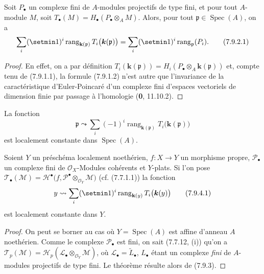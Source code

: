 \begin{proposition}[7.9.2]
\label{III.7.9.2.fr}
Soit $P_\bullet$ un complexe fini de $A$-modules projectifs de type fini, et
pour tout $A$-module $M$, soit
$T_\bullet(M)=H_\bullet(P_\bullet\otimes_A M)$. Alors, pour tout
$\mathfrak p\in\operatorname{Spec}(A)$, on a
\[
  \sum_i(\setmin 1)^i\operatorname{rang}_{\mathbf{k}(\mathfrak p)}
  T_i\bigl(\boldsymbol{k}(\mathfrak p)\bigr)
  =\sum_i(\setmin 1)^i\operatorname{rang}_{\mathfrak p}(P_i).
  \tag{7.9.2.1}\label{III.7.9.2.1.fr}
\]
\end{proposition}

\begin{proof}
En effet, on a par définition
$T_i(\boldsymbol{k}(\mathfrak p))=H_i(P_\bullet\otimes_A\boldsymbol{k}(\mathfrak p))$ et,
compte tenu de (7.9.1.1), la formule (7.9.1.2) n'est autre que l'invariance de
la caractéristique d'Euler-Poincaré d'un complexe fini d'espaces vectoriels de
dimension finie par passage à l'homologie (\textbf{0}, 11.10.2).
\end{proof}

\begin{corollary}[7.9.3]
\label{III.7.9.3.fr}
La fonction
\[
  \mathfrak p\leadsto
  \sum_i(-1)^i\operatorname{rang}_{\mathbf{k}(\mathfrak p)}
  T_i\bigl(\boldsymbol{k}(\mathfrak p)\bigr)
\]
est localement constante dans $\operatorname{Spec}(A)$.
\end{corollary}

\begin{theorem}[7.9.4]
\label{III.7.9.4.fr}
Soient $Y$ un préschéma localement noethérien, $f:X\to Y$ un morphisme propre,
$\mathscr P_\bullet$ un complexe fini de $\mathscr O_X$-Modules cohérents et
$Y$-plats. Si l'on pose
$\mathscr T_\bullet(\mathscr M)
  =\mathscr H^{\bullet}
  \bigl(f,\mathscr P^\bullet\otimes_{\mathscr O_Y}\mathscr M\bigr)$ \textup{(cf. (7.7.1.1))}
la fonction
\[
  y\leadsto
  \sum_i(\setmin 1)^i\operatorname{rang}_{\mathbf{k}(y)}
  T_i\bigl(\boldsymbol{k}(y)\bigr)
  \tag{7.9.4.1}\label{III.7.9.4.1.fr}
\]
est localement constante dans $Y$.
\end{theorem}

\begin{proof}
On peut se borner au cas où $Y=\operatorname{Spec}(A)$ est affine d'anneau $A$
noethérien. Comme le complexe $\mathscr P_\bullet$ est fini, on sait (7.7.12,
(i)) qu'on a
$\mathscr T_p(\mathscr M)=\mathscr H_p(\mathscr L_\bullet\otimes_{\mathscr O_Y}\mathscr M)$, où
$\mathscr L_\bullet=\widetilde{L}_\bullet$,
$L_\bullet$ étant un complexe \emph{fini} de $A$-modules projectifs de type
fini. Le théorème résulte alors de (7.9.3).
\end{proof}


